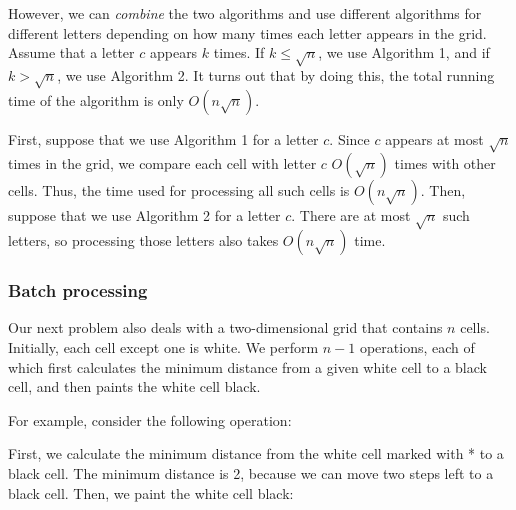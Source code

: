 However, we can \emph{combine} the two algorithms and
use different algorithms for different letters
depending on how many times each letter appears in the grid.
Assume that a letter $c$ appears $k$ times.
If $k \le \sqrt n$, we use Algorithm 1, and if $k > \sqrt n$,
we use Algorithm 2.
It turns out that by doing this, the total running time
of the algorithm is only $O(n \sqrt n)$.

First, suppose that we use Algorithm 1 for a letter $c$.
Since $c$ appears at most $\sqrt n$ times in the grid,
we compare each cell with letter $c$ $O(\sqrt n)$ times
with other cells.
Thus, the time used for processing all such cells is $O(n \sqrt n)$.
Then, suppose that we use Algorithm 2 for a letter $c$.
There are at most $\sqrt n$ such letters,
so processing those letters also takes $O(n \sqrt n)$ time.

\subsubsection{Batch processing}

Our next problem also deals with
a two-dimensional grid that contains $n$ cells.
Initially, each cell except one is white.
We perform $n-1$ operations, each of which first
calculates the minimum distance from a given white cell
to a black cell, and then paints the white cell black.

For example, consider the following operation:

\begin{center}
\end{center}

First, we calculate the minimum distance
from the white cell marked with * to a black cell.
The minimum distance is 2, because we can move
two steps left to a black cell.
Then, we paint the white cell black:

\begin{center}
\end{center}

